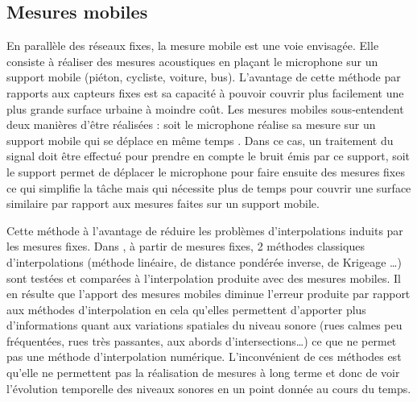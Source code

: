 \subsection{Mesures mobiles}
En parallèle des réseaux fixes, la mesure mobile est une voie envisagée. Elle consiste à réaliser des mesures acoustiques en plaçant le microphone sur un support mobile (piéton, cycliste, voiture, bus). L'avantage de cette méthode par rapports aux capteurs fixes est sa capacité à pouvoir couvrir plus facilement une plus grande surface urbaine à moindre coût. Les mesures mobiles sous-entendent deux manières d'être réalisées : soit le microphone réalise sa mesure sur un support mobile qui se déplace en même temps \cite{alsina-pages_design_2016}. Dans ce cas, un traitement du signal doit être effectué pour prendre en compte le bruit émis par ce support, soit le support permet de déplacer le microphone pour faire ensuite des mesures fixes \cite{manvell2004sadmam} ce qui simplifie la tâche mais qui nécessite plus de temps pour couvrir une surface similaire par rapport aux mesures faites sur un support mobile. 

Cette méthode à l'avantage de réduire les problèmes d'interpolations induits par les mesures fixes. Dans \cite{can_measurement_2014}, à partir de mesures fixes, 2 méthodes classiques d'interpolations (méthode linéaire, de distance pondérée inverse, de Krigeage \dots) sont testées et comparées à l'interpolation produite avec des mesures mobiles. Il en résulte que l'apport des mesures mobiles diminue l'erreur produite par rapport aux méthodes d'interpolation en cela qu'elles permettent d'apporter plus d'informations quant aux variations spatiales du niveau sonore (rues calmes peu fréquentées, rues très passantes, aux abords d'intersections\dots) ce que ne permet pas une méthode d'interpolation numérique. L'inconvénient de ces méthodes est qu'elle ne permettent pas la réalisation de mesures à long terme et donc de voir l'évolution temporelle des niveaux sonores en un point donnée au cours du temps.

